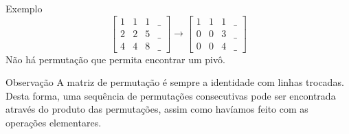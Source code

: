 \documentclass{beamer}
\begin{document}
\begin{darkframes}
\begin{frame}{Exemplo}
  \begin{equation*}
  \begin{bmatrix}
      1 & 1 & 1 & \_ \\
      2 & 2 & 5 & \_ \\
      4 & 4 & 8 & \_
  \end{bmatrix}
  \rightarrow 
  \begin{bmatrix}
      1 & 1 & 1 & \_ \\
      0 & 0 & 3 & \_ \\
      0 & 0 & 4 & \_
  \end{bmatrix}
	\end{equation*}
	Não há permutação que permita encontrar um pivô.
\end{frame}

\begin{frame}{Observação}
 A matriz de permutação é sempre a identidade com linhas trocadas. Desta forma, uma sequência de permutações consecutivas pode ser encontrada através do produto das permutações, assim como havíamos feito com as operações elementares.
\end{frame}
\end{darkframes}
\end{document}
